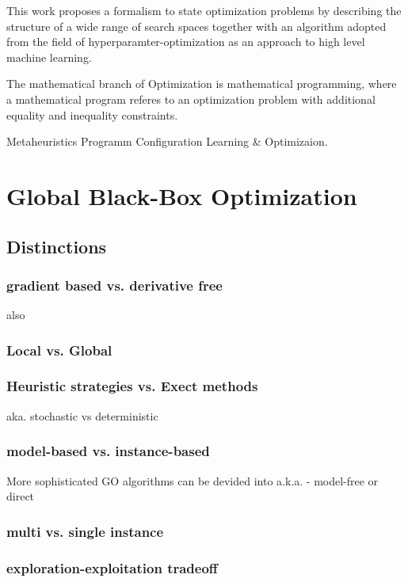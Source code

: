 \documentclass[english]{article}
\begin{document}
This work proposes a formalism to state optimization problems by describing the structure of a wide range of search spaces together with an algorithm adopted from the field of hyperparamter-optimization as an approach to high level machine learning.



The mathematical branch of Optimization is mathematical programming, where a mathematical program referes to an optimization problem with additional equality and inequality constraints.

Metaheuristics
Programm Configuration
Learning \& Optimizaion.


\section{Global Black-Box Optimization}

\subsection{Distinctions}

\subsubsection*{gradient based vs. derivative free}
also

\subsubsection*{Local vs. Global}

\subsubsection*{Heuristic strategies vs. Exect methods}
aka. stochastic vs deterministic

\subsubsection*{model-based vs. instance-based}
More sophisticated \ac{GO} algorithms can be devided into
a.k.a. - model-free or direct

\subsubsection*{multi vs. single instance}

\subsubsection*{exploration-exploitation tradeoff}
\end{document}
